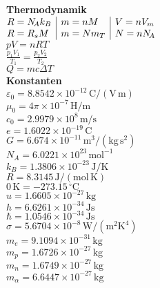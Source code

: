 \documentclass[a4paper,10pt,fleqn,twoside,twocolumn,dvipdfmx]{scrartcl}
\newcommand{\strong}[1]{\textsf{\textbf{#1}}}
\newcommand{\ds}{\displaystyle}
\begin{document}
\strong{Thermodynamik}\\
$\begin{array}{@{}l|l|l}
R = N_{\!A} k_B & m = nM & V = nV_m\\
R = R_s M & m = Nm_T & N=nN_{\!A}
\end{array}$\\
$pV = nRT$\\
$\ds \frac{p_1 V_1}{T_1} = \frac{p_2 V_2}{T_2}$\\
$Q =mc\Delta T$\\[4pt]
\strong{Konstanten}\\
$\varepsilon_0 = 8.8542\times 10^{-12}\,\mathrm{C/(V\,m)}$\\
$\mu_0 = 4\pi\times 10^{-7}\,\mathrm{H/m}$\\
$c_0 = 2.9979\times 10^{8}\,\mathrm{m/s}$\\
$e = 1.6022\times 10^{-19}\,\mathrm{C}$\\
$G = 6.674\times 10^{-11}\,\mathrm{m^3/(kg\,s^2)}$\\[4pt]
%
$N_{\!A} = 6.0221\times 10^{23}\,\mathrm{mol}^{-1}$\\
$k_B = 1.3806\times 10^{-23}\,\mathrm{J/K}$\\
$R = 8.3145\,\mathrm{J/(mol\,K)}$\\[4pt]
%
$0\,\mathrm K = -273.15\,\mathrm{{}^\circ C}$\\
$u = 1.6605\times 10^{-27}\,\mathrm{kg}$\\
$h = 6.6261\times 10^{-34}\,\mathrm{Js}$\\
$\hbar = 1.0546\times 10^{-34}\,\mathrm{Js}$\\
$\sigma = 5.6704\times 10^{-8}\,\mathrm{W/(m^2 K^4)}$\\[4pt]
%
$m_e = 9.1094\times 10^{-31}\,\mathrm{kg}$\\
$m_p = 1.6726\times 10^{-27}\,\mathrm{kg}$\\
$m_n = 1.6749\times 10^{-27}\,\mathrm{kg}$\\
$m_\alpha = 6.6447\times 10^{-27}\,\mathrm{kg}$

\end{document}
